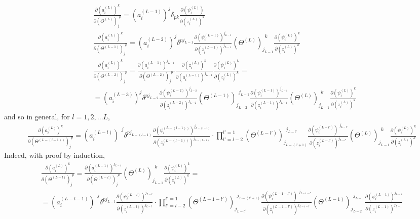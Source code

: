 \documentclass[10pt]{amsart}
\begin{document}
\begin{multicols*}{2}
\begin{equation}
\begin{aligned}
& \frac{ \partial (a_i^{(L)})^k }{ \partial (\Theta^{(L)})_j^{\  \  p} } = (a_i^{(L-1)})^j \delta_{pk} \frac{\partial (\psi_i^{(L)})}{\partial (z_i^{(L)})^k} \\ 
& \frac{ \partial (a_i^{(L)})^k }{ \partial (\Theta^{(L-1)})_j^{\  \  p} } = (a^{(L-2)}_i)^j \delta^{pj_{L-1}} \frac{\partial (\psi_i^{(L-1)})^{j_{L-1}}}{\partial (z_i^{(L-1)})^{j_{L-1}} } (\Theta^{(L)})_{j_{L-1}}^{\  \  k} \frac{ \partial (\psi_i^{(L)})^k }{ \partial (z_i^{(L)})^k } \\
& \frac{ \partial (a_i^{(L)})^k }{ \partial (\Theta^{(L-2)})_j^{\  \  p} } = \frac{ \partial (a_i^{(L-1)})^{j_{L-1} }}{ \partial (\Theta^{(L-2)})_j^{\  \  p} } \frac{ \partial (z^{(L)}_i)^k }{ \partial (a_i^{(L-1)})^{j_{L-1}} } \frac{ \partial (\psi_i^{(L)})^k }{ \partial (z_i^{(L)})^k } = \\
& = (a^{(L-3)}_i)^j \delta^{pj_{L-2}} \frac{\partial (\psi_i^{(L-2)})^{j_{L-2}}}{\partial (z_i^{(L-2)})^{j_{L-2}} } (\Theta^{(L-1)})_{j_{L-2}}^{\  \  j_{L-1}} \frac{ \partial (\psi_i^{(L-1)})^{j_{L-1} }}{ \partial (z_i^{(L-1)})^{j_{L-1} } } (\Theta^{(L)})_{j_{L-1}}^{\  \  k} \frac{ \partial (\psi_i^{(L)})^k }{ \partial (z_i^{(L)})^k }
\end{aligned}
\end{equation}
and so in general, for $l=1,2,\dots L$, 
\begin{equation}\label{Eq:DNNpartialaL_noKroneckerdelta}
\boxed{ \begin{gathered}
	\frac{\partial (a_i^{(L)})^k }{ \partial (\Theta^{(L-(l-1))})_j^{\  \  p} } =   (a_i^{(L-l)})^{\  \  j} \delta^{pj_{L-(l-1)} }   \frac{ \partial (\psi_i^{(L-(l-1))})^{j_{L-(l-1)} } }{ \partial (z_i^{(L-(l-1))})^{j_{L-(l-1)} } } 	\cdot \prod_{l' = l-2}^{l'=1} (\Theta^{(L-l')})_{ j_{L-(l'+1)}}^{\  \  j_{L-l'}}      \frac{ \partial (\psi_i^{(L-l')})^{\  \  j_{L-l'} } }{ \partial (z_i^{(L-l')})^{ j_{L-l'}} } (\Theta^{(L)})_{ j_{L-1}}^{\  \  k}      \frac{ \partial (\psi_i^{(L)})^{ k } }{ \partial (z_i^{(L)})^{  k} }
	\end{gathered} 
}
\end{equation}
Indeed, with proof by induction, 
\[
\begin{gathered}
\frac{\partial (a_i^{(L)})^k }{ \partial (\Theta^{(L-l)})_j^{\  \  p} } = \frac{ \partial (a_i^{(L-1)})^{j_{L-1} }}{ \partial (\Theta^{(L-l)})_j^{\  \  p} }  (\Theta^{(L)})_{j_{L-1}}^{\  \  k} \frac{ \partial (\psi_i^{(L)})^k }{ \partial (z_i^{(L)})^k } = \\
= (a_i^{(L-l-1)})^{\  \  j} \delta^{pj_{L-l} }   \frac{ \partial (\psi_i^{(L-l)})^{j_{L-l} } }{ \partial (z_i^{(L-l)})^{j_{L-l} } } 	\cdot \prod_{l' = l-2}^{l'=1} (\Theta^{(L-1-l')})_{ j_{L-l'}}^{\  \  j_{L-(l'+1)}}      \frac{ \partial (\psi_i^{(L-1-l')})^{\  \  j_{L-1-l'} } }{ \partial (z_i^{(L-1-l')})^{ j_{L-1-l'}} } (\Theta^{(L-1)})_{ j_{L-2}}^{\  \  j_{L-1}}      \frac{ \partial (\psi_i^{(L-1)})^{ j_{L-1} } }{ \partial (z_i^{(L-1)})^{  j_{L-1}} }

\end{gathered}\]
\end{multicols*}
\end{document}
